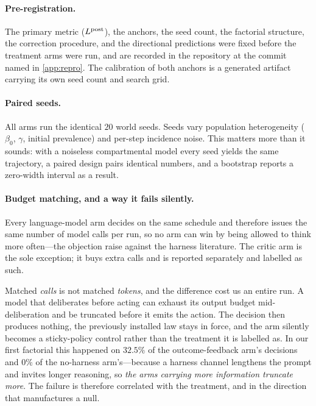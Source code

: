 \documentclass[11pt]{article}
\begin{document}
\paragraph{Pre-registration.} The primary metric ($L^{\mathrm{post}}$), the anchors, the seed count, the
factorial structure, the correction procedure, and the directional predictions were fixed before the
treatment arms were run, and are recorded in the repository at the commit named in
\cref{app:repro}. The calibration of both anchors is a generated artifact carrying its own seed
count and search grid.

\paragraph{Paired seeds.} All arms run the identical $20$ world seeds. Seeds vary population
heterogeneity ($\beta_0$, $\gamma$, initial prevalence) and per-step incidence noise. This matters
more than it sounds: with a noiseless compartmental model every seed yields the same trajectory, a
paired design pairs identical numbers, and a bootstrap reports a zero-width interval as a result.

\paragraph{Budget matching, and a way it fails silently.} Every language-model arm decides on the
same schedule and therefore issues the same number of model calls per run, so no arm can win by
being allowed to think more often---the objection \citet{wang2026rethinking} raise against the
harness literature. The critic arm is the sole exception; it buys extra calls and is reported
separately and labelled as such.

Matched \emph{calls} is not matched \emph{tokens}, and the difference cost us an entire run. A model
that deliberates before acting can exhaust its output budget mid-deliberation and be truncated before
it emits the action. The decision then produces nothing, the previously installed law stays in force,
and the arm silently becomes a sticky-policy control rather than the treatment it is labelled as. In
our first factorial this happened on $32.5\%$ of the outcome-feedback arm's decisions and $0\%$ of the
no-harness arm's---because a harness channel lengthens the prompt and invites longer reasoning, so
\emph{the arms carrying more information truncate more}. The failure is therefore correlated with the
treatment, and in the direction that manufactures a null.
\end{document}
